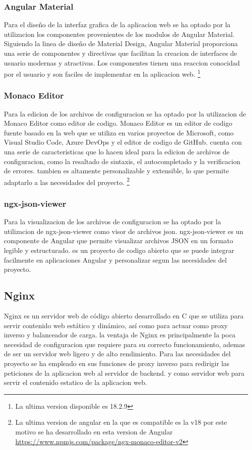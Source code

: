 \documentclass[12pt, a4paper, twoside]{article}
\begin{document}
\subsubsection{Angular Material}
\cite{angular_material}
Para el diseño de la interfaz grafica de la aplicacion web se ha optado por la utilizacion los componentes provenientes de los modulos de Angular Material.
Siguiendo la linea de diseño de Material Design, Angular Material proporciona una serie de componentes y directivas que facilitan la creacion de interfaces de usuario modernas y atractivas.
Los componentes tienen una reaccion conocidad por el usuario y son faciles de implementar en la aplicacion web. \footnote{La ultima version disponible es 18.2.9 }
\subsubsection{Monaco Editor}
\cite{monaco_editor} Para la edicion de los archivos de configuracion se ha optado por la utilizacion de Monaco Editor como editor de codigo.
Monaco Editor es un editor de codigo fuente basado en la web que se utiliza en varios proyectos de Microsoft, como Visual Studio Code, Azure DevOps y el editor de codigo de GitHub.
cuenta con una serie de caracteristicas que lo hacen ideal para la edicion de archivos de configuracion, como la resaltado de sintaxis, el autocompletado y la verificacion de errores.
tambien es altamente personalizable y extensible, lo que permite adaptarlo a las necesidades del proyecto. \footnote{La ultima version de angular en la que es compatible es la v18 por este motivo se ha desarrollado en esta version de Angular \href{https://www.npmjs.com/package/ngx-monaco-editor-v2}{https://www.npmjs.com/package/ngx-monaco-editor-v2}}
\subsubsection{ngx-json-viewer}
\cite{ngx_json_viewer}
Para la visualizacion de los archivos de configuracion se ha optado por la utilizacion de ngx-json-viewer como visor de archivos json.
ngx-json-viewer es un componente de Angular que permite visualizar archivos JSON en un formato legible y estructurado.
es un proyecto de codigo abierto que se puede integrar facilmente en aplicaciones Angular y personalizar segun las necesidades del proyecto.

\subsection{Nginx}
\cite{nginx} 
Nginx es un servidor web de código abierto desarrollado en C que se utiliza para servir contenido web estático y dinámico, así como para actuar como proxy inverso y balanceador de carga.
la ventaja de Nginx es principalmente la poca necesidad de configuracion que requiere para su correcto funcionamiento, ademas de ser un servidor web ligero y de alto rendimiento.
Para las necesidades del proyecto se ha empleado en sus funciones de proxy inverso para redirigir las peticiones de la aplicacion web al servidor de backend.
y como servidor web para servir el contenido estatico de la aplicacion web.
\end{document}
